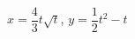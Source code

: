 \hspace*{2mm}\begin{minipage}[t]{\dimexpr\linewidth-2mm\relax}\vspace{0pt}
$x=\dfrac{4}{3}t\sqrt{t}$, $y=\dfrac{1}{2}t^2-t$\end{minipage}
